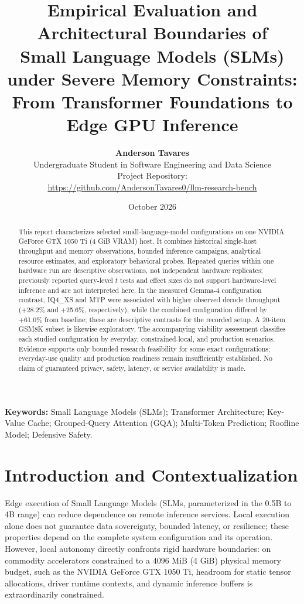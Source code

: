 \documentclass[10pt,a4paper,twocolumn]{article}
\title{\textbf{Empirical Evaluation and Architectural Boundaries of\\Small Language Models (SLMs) under Severe Memory Constraints:\\From Transformer Foundations to Edge GPU Inference}}
\author{\textbf{Anderson Tavares}\\\normalsize Undergraduate Student in Software Engineering and Data Science\\\normalsize Project Repository:\\\url{https://github.com/AndersonTavares0/llm-research-bench}}
\date{October 2026}
\begin{document}
\maketitle

\begin{abstract}
\noindent This report characterizes selected small-language-model configurations on one NVIDIA GeForce GTX 1050 Ti (4 GiB VRAM) host. It combines historical single-host throughput and memory observations, bounded inference campaigns, analytical resource estimates, and exploratory behavioral probes. Repeated queries within one hardware run are descriptive observations, not independent hardware replicates; previously reported query-level $t$ tests and effect sizes do not support hardware-level inference and are not interpreted here. In the measured Gemma-4 configuration contrast, IQ4\_XS and MTP were associated with higher observed decode throughput (+28.2\% and +25.6\%, respectively), while the combined configuration differed by +61.0\% from baseline; these are descriptive contrasts for the recorded setup. A 20-item GSM8K subset is likewise exploratory. The accompanying viability assessment classifies each studied configuration by everyday, constrained-local, and production scenarios. Evidence supports only bounded research feasibility for some exact configurations; everyday-use quality and production readiness remain insufficiently established. No claim of guaranteed privacy, safety, latency, or service availability is made.
\end{abstract}

\noindent\textbf{Keywords:} Small Language Models (SLMs); Transformer Architecture; Key-Value Cache; Grouped-Query Attention (GQA); Multi-Token Prediction; Roofline Model; Defensive Safety.

\clearpage

\section{Introduction and Contextualization}

Edge execution of Small Language Models (SLMs, parameterized in the 0.5B to 4B range) can reduce dependence on remote inference services. Local execution alone does not guarantee data sovereignty, bounded latency, or resilience; these properties depend on the complete system configuration and its operation. However, local autonomy directly confronts rigid hardware boundaries: on commodity accelerators constrained to a $4096\text{ MiB}$ (4 GiB) physical memory budget, such as the NVIDIA GeForce GTX 1050 Ti, headroom for static tensor allocations, driver runtime contexts, and dynamic inference buffers is extraordinarily constrained.
\end{document}
